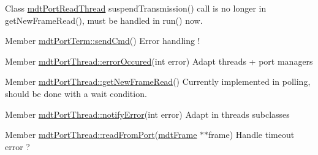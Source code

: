 \label{todo__todo000029}
\hypertarget{todo__todo000029}{}
 
\begin{DoxyDescription}
\item[Class \hyperlink{classmdt_port_read_thread}{mdtPortReadThread} ]suspendTransmission() call is no longer in getNewFrameRead(), must be handled in run() now. 
\end{DoxyDescription}

\label{todo__todo000054}
\hypertarget{todo__todo000054}{}
 
\begin{DoxyDescription}
\item[Member \hyperlink{classmdt_port_term_a7ec568c44f862fe7aee83f1a271ac6bb}{mdtPortTerm::sendCmd}() ]Error handling ! 
\end{DoxyDescription}

\label{todo__todo000031}
\hypertarget{todo__todo000031}{}
 
\begin{DoxyDescription}
\item[Member \hyperlink{classmdt_port_thread_ab31cbe1a85aa830cd368654d1f806326}{mdtPortThread::errorOccured}(int error) ]Adapt threads + port managers
\end{DoxyDescription}

\label{todo__todo000032}
\hypertarget{todo__todo000032}{}
 
\begin{DoxyDescription}
\item[Member \hyperlink{classmdt_port_thread_a611211e56620ec9c699019452716e4fc}{mdtPortThread::getNewFrameRead}() ]Currently implemented in polling, should be done with a wait condition.
\end{DoxyDescription}

\label{todo__todo000033}
\hypertarget{todo__todo000033}{}
 
\begin{DoxyDescription}
\item[Member \hyperlink{classmdt_port_thread_ad2c618a032c0aeed0f0cb3b30bc0aba9}{mdtPortThread::notifyError}(int error) ]Adapt in threads subclasses 
\end{DoxyDescription}

\label{todo__todo000030}
\hypertarget{todo__todo000030}{}
 
\begin{DoxyDescription}
\item[Member \hyperlink{classmdt_port_thread_a2e0c384ae6c909cb40fc0ca1a0189ca6}{mdtPortThread::readFromPort}(\hyperlink{classmdt_frame}{mdtFrame} $\ast$$\ast$frame) ]Handle timeout error ? 
\end{DoxyDescription}


